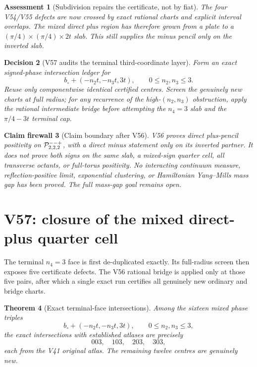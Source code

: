 \documentclass[11pt,oneside]{article}
\newtheorem{theorem}{Theorem}[section]
\newtheorem{assessment}[theorem]{Assessment}
\newtheorem{firewall}[theorem]{Claim firewall}
\newtheorem{decision}[theorem]{Decision}
\theoremstyle{definition}
\theoremstyle{remark}
\begin{document}
\begin{assessment}[Subdivision repairs the certificate, not by fiat]
\label{ass:newv56}
The four V54/V55 defects are now crossed by exact rational charts
and explicit interval overlaps.  The mixed direct plus region has
therefore grown from a plate to a
\((\pi/4)\times(\pi/4)\times2t\) slab.  This still supplies the
minus pencil only on the inverted slab.
\end{assessment}

\begin{decision}[V57 audits the terminal third-coordinate layer]
\label{dec:newv56-next}
Form an exact signed-phase intersection ledger for
\[
 b_\circ+(-n_2t,-n_3t,3t),\qquad0\le n_2,n_3\le3.    \tag{56.12}
\]
Reuse only componentwise identical certified centres.  Screen the
genuinely new charts at full radius; for any recurrence of the
high-\((n_2,n_3)\) obstruction, apply the rational intermediate
bridge before attempting the \(n_4=3\) slab and the
\(\pi/4-3t\) terminal cap.
\end{decision}

\begin{firewall}[Claim boundary after V56]
\label{fire:newv56-final}
V56 proves direct plus-pencil positivity on
\({\cal P}_{2,2,2}^{--+}\), with a direct minus statement only on
its inverted partner.  It does not prove both signs on the same
slab, a mixed-sign quarter cell, all transverse octants, or
full-torus positivity.  No interacting continuum measure,
reflection-positive limit, exponential clustering, or Hamiltonian
Yang--Mills mass gap has been proved.  The full mass-gap goal
remains open.
\end{firewall}

\section{V57: closure of the mixed direct-plus quarter cell}
\label{sec:newv57-mixed-quarter-cell}

The terminal \(n_4=3\) face is first de-duplicated exactly.  Its
full-radius screen then exposes five certificate defects.  The V56
rational bridge is applied only at those five pairs, after which a
single exact run certifies all genuinely new ordinary and bridge
charts.

\begin{theorem}[Exact terminal-face intersections]
\label{thm:newv57-intersections}
Among the sixteen mixed phase triples
\[
 b_\circ+(-n_2t,-n_3t,3t),\qquad0\le n_2,n_3\le3,    \tag{57.1}
\]
the exact intersections with established atlases are precisely
\[
 003,\quad103,\quad203,\quad303,                      \tag{57.2}
\]
each from the V41 original atlas.  The remaining twelve centres are
genuinely new.
\end{theorem}
\end{document}
